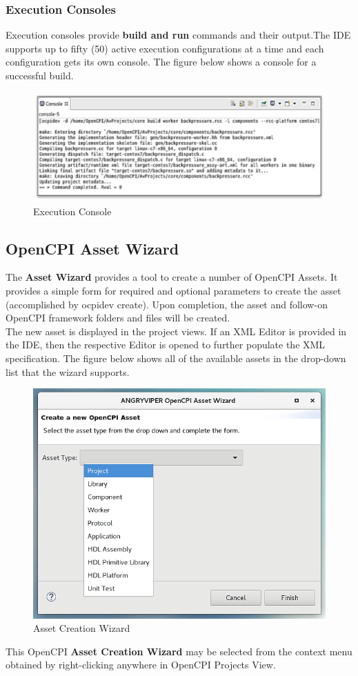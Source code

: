 \documentclass[10pt, a4paper, oneside]{article}
\begin{document}
\subsubsection{Execution Consoles}
Execution consoles provide \textbf{build and run} commands and their output.The IDE supports up to fifty (50) active execution configurations at a time and each configuration gets its own console. The figure below shows a console for a successful build.
\begin{figure}[h!]
	\centering
	\caption{Execution Console}\label{fig:ExecutionConsole.png}
	\includegraphics[width=.85\textwidth]{ExecutionConsole.png}
 \end{figure}
\subsection{OpenCPI Asset Wizard}
The \textbf{Asset Wizard} provides a tool to create a number of OpenCPI Assets. It provides a simple form for required and optional parameters to create the asset (accomplished by ocpidev create). Upon completion, the asset and follow-on OpenCPI framework folders and files will be created. \\

The new asset is displayed in the project views. If an XML Editor is provided in the IDE, then the respective Editor is opened to further populate the XML specification. The figure below shows all of the available assets in the drop-down list that the wizard supports.
\begin{figure}[h!]
	\centering
	\caption{Asset Creation Wizard}\label{fig:AssetCreationWizard}
	\includegraphics[width=.85\textwidth]{AssetCreationWizard.png}
 \end{figure}
This OpenCPI \textbf{Asset Creation Wizard} may be selected from the context menu obtained by right-clicking anywhere in OpenCPI Projects View.\\
\end{document}
